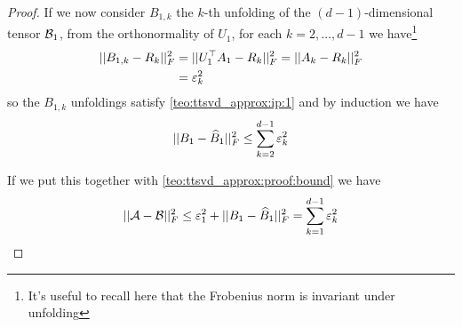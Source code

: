 \begin{Teo}
\begin{proof}
    If we now consider $B_{1,k}$ the $k$-th unfolding of the $(d-1)$-dimensional tensor $\mathcal{B}_1$, from the orthonormality of $U_1$, for each $k=2,\ldots,d-1$ we have\footnote{It's useful to recall here that the Frobenius norm is invariant under unfolding}
    \begin{equation*}
      \begin{split}
        ||B_{1,k} - R_k||_F^2 &= ||U_1^\top A_1 - R_k||_F^2 = ||A_k - R_k||_F^2\\
         &= \varepsilon_k^2
      \end{split}
    \end{equation*}
    so the $B_{1,k}$ unfoldings satisfy \ref{teo:ttsvd_approx:ip:1} and by induction we have
    \begin{equation*}
      ||B_1 - \widehat{B}_1 ||_F^2 \le \sum_{k=2}^{d-1} \varepsilon_k^2
    \end{equation*}

    If we put this together with \ref{teo:ttsvd_approx:proof:bound} we have
    \begin{equation*}
      ||\mathcal{A} - \mathcal{B}||_F^2 \le \varepsilon_1^2 + ||B_1 - \widehat{B}_1 ||_F^2 = \sum_{k=1}^{d-1} \varepsilon_k^2
    \end{equation*}
  \end{proof}
\end{Teo}

